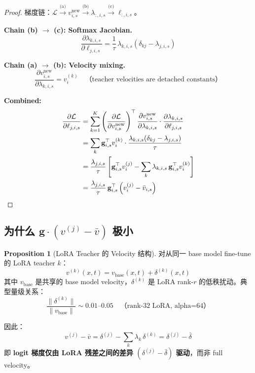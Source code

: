 \documentclass[11pt,a4paper]{article}
\newcommand{\loss}{\mathcal{L}}
\theoremstyle{definition}
\newtheorem{proposition}{Proposition}
\begin{document}
\begin{proof}
梯度链：$\loss \xrightarrow{\text{(a)}} v^{\mathrm{new}}_{i,s} \xrightarrow{\text{(b)}} \lambda_{:,i,s} \xrightarrow{\text{(c)}} \ell_{:,i,s}$。

\textbf{Chain (b) $\to$ (c): Softmax Jacobian.}
\begin{equation}
\frac{\partial \lambda_{k,i,s}}{\partial \ell_{j,i,s}} = \frac{1}{\tau}\,\lambda_{k,i,s}\left(\delta_{kj} - \lambda_{j,i,s}\right)
\end{equation}

\textbf{Chain (a) $\to$ (b): Velocity mixing.}
\begin{equation}
\frac{\partial v^{\mathrm{new}}_{i,s}}{\partial \lambda_{k,i,s}} = v^{(k)}_i \quad\text{（teacher velocities are detached constants）}
\end{equation}

\textbf{Combined:}
\begin{align}
\frac{\partial \loss}{\partial \ell_{j,i,s}} &= \sum_{k=1}^K \left(\frac{\partial \loss}{\partial v^{\mathrm{new}}_{i,s}}\right)^\top \frac{\partial v^{\mathrm{new}}_{i,s}}{\partial \lambda_{k,i,s}} \cdot \frac{\partial \lambda_{k,i,s}}{\partial \ell_{j,i,s}} \\
&= \sum_k \mathbf{g}_{i,s}^\top v^{(k)}_i \cdot \frac{\lambda_{k,i,s}(\delta_{kj} - \lambda_{j,i,s})}{\tau} \\
&= \frac{\lambda_{j,i,s}}{\tau}\left[\mathbf{g}_{i,s}^\top v^{(j)}_i - \sum_k \lambda_{k,i,s}\,\mathbf{g}_{i,s}^\top v^{(k)}_i\right] \\
&= \frac{\lambda_{j,i,s}}{\tau}\,\mathbf{g}_{i,s}^\top\left(v^{(j)}_i - \bar{v}_{i,s}\right) \qedhere
\end{align}
\end{proof}

\subsection{为什么 $\mathbf{g} \cdot (v^{(j)} - \bar{v})$ 极小}

\begin{proposition}[LoRA Teacher 的 Velocity 结构]
\label{prop:lora_structure}
对从同一 base model fine-tune 的 LoRA teacher $k$：
\begin{equation}
v^{(k)}(x, t) = v_{\mathrm{base}}(x, t) + \delta^{(k)}(x, t)
\label{eq:lora_decomp}
\end{equation}
其中 $v_{\mathrm{base}}$ 是共享的 base model velocity，$\delta^{(k)}$ 是 LoRA rank-$r$ 的低秩扰动。典型量级关系：
\begin{equation}
\frac{\|\delta^{(k)}\|}{\|v_{\mathrm{base}}\|} \sim 0.01\text{--}0.05 \quad\text{（rank-32 LoRA, alpha=64）}
\end{equation}

因此：
\begin{equation}
v^{(j)} - \bar{v} = \delta^{(j)} - \sum_k \lambda_k\, \delta^{(k)} = \delta^{(j)} - \bar{\delta}
\label{eq:delta_diff}
\end{equation}
即 \textbf{logit 梯度仅由 LoRA 残差之间的差异 $(\delta^{(j)} - \bar{\delta})$ 驱动}，而非 full velocity。
\end{proposition}
\end{document}
